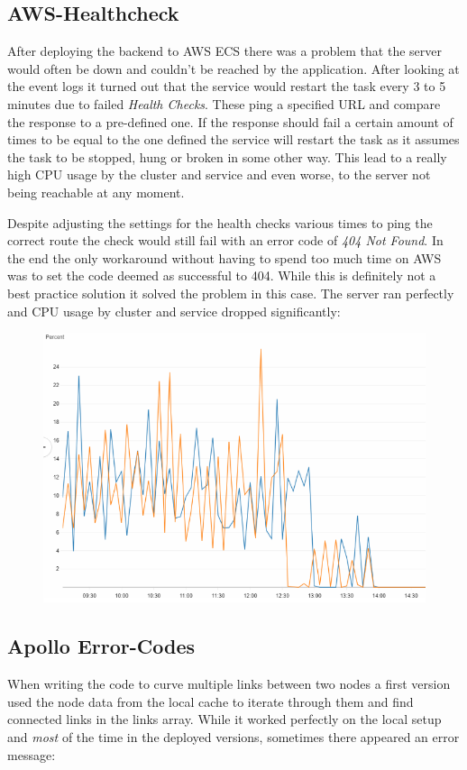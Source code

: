 \subsection{AWS-Healthcheck}
After deploying the backend to AWS ECS there was a problem that the server would often be down and couldn't be reached by the application. After looking at the event logs it turned out that the service would restart the task every 3 to 5 minutes due to failed \emph{Health Checks}. These ping a specified URL and compare the response to a pre-defined one. If the response should fail a certain amount of times to be equal to the one defined the service will restart the task as it assumes the task to be stopped, hung or broken in some other way. This lead to a really high CPU usage by the cluster and service and even worse, to the server not being reachable at any moment.

Despite adjusting the settings for the health checks various times to ping the correct route the check would still fail with an error code of \emph{404 Not Found}. In the end the only workaround without having to spend too much time on AWS was to set the code deemed as successful to 404. While this is definitely not a best practice solution it solved the problem in this case. The server ran perfectly and CPU usage by cluster and service dropped significantly:
\begin{figure}[H]
\centering
\includegraphics[scale=.6]{Bilder/AwsCpuReduction.png}
\end{figure}

\subsection{Apollo Error-Codes}
When writing the code to curve multiple links between two nodes a first version used the node data from the local cache to iterate through them and find connected links in the links array. While it worked perfectly on the local setup and \emph{most} of the time in the deployed versions, sometimes there appeared an error message: \\

